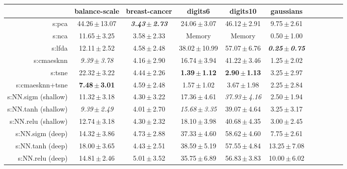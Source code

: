 \begin{table}[ht] \centering
{\small\renewcommand{\arraystretch}{0.7}
\setlength{\tabcolsep}{1pt}
\hspace*{-36pt}
\begin{tabular}{rcccccccccc}
\toprule


& \multicolumn{1}{c}{balance-scale} & \multicolumn{1}{c}{breast-cancer} & \multicolumn{1}{c}{digits6} & \multicolumn{1}{c}{digits10} & \multicolumn{1}{c}{gaussians} \\ 
\midrule
s:\ac{pca} & 44.26\,$\pm$\,13.07 & \emph{\textbf{3.43\,$\pm$\,2.73}} & 24.06\,$\pm$\,3.07 & 46.12\,$\pm$\,2.91 & 9.75\,$\pm$\,2.61 \\
s:\ac{nca} & 11.65\,$\pm$\,3.25 & 3.58\,$\pm$\,2.33 & Memory  & Memory  & 0.50\,$\pm$\,1.00 \\
s:\ac{lfda} & 12.11\,$\pm$\,2.52 & 4.58\,$\pm$\,2.48 & 38.02\,$\pm$\,10.99 & 57.07\,$\pm$\,6.76 & \emph{\textbf{0.25\,$\pm$\,0.75}} \\
s:\ac{cmaesknn} & \emph{9.39\,$\pm$\,3.78} & 4.16\,$\pm$\,2.90 & 16.74\,$\pm$\,3.94 & 41.22\,$\pm$\,3.46 & 1.25\,$\pm$\,2.02 \\
s:\ac{tsne} & 22.32\,$\pm$\,3.22 & 4.44\,$\pm$\,2.26 & \textbf{1.39\,$\pm$\,1.12} & \textbf{2.90\,$\pm$\,1.13} & 3.25\,$\pm$\,2.97 \\
s:\ac{cmaesknn}+\ac{tsne} & \textbf{7.48\,$\pm$\,3.01} & 4.59\,$\pm$\,2.48 & 1.57\,$\pm$\,1.02 & 3.67\,$\pm$\,1.98 & 2.25\,$\pm$\,2.84 \\
s:NN.sigm (shallow) & 11.32\,$\pm$\,3.18 & 4.30\,$\pm$\,3.22 & 17.36\,$\pm$\,4.61 & \emph{37.93\,$\pm$\,4.16} & 2.50\,$\pm$\,1.94 \\
s:NN.\ac{tanh} (shallow) & \emph{9.39\,$\pm$\,2.49} & 4.01\,$\pm$\,2.70 & \emph{15.68\,$\pm$\,3.35} & 39.07\,$\pm$\,4.64 & 3.25\,$\pm$\,3.17 \\
s:NN.\ac{relu} (shallow) & 12.74\,$\pm$\,3.18 & 4.30\,$\pm$\,2.32 & 18.10\,$\pm$\,3.98 & 40.68\,$\pm$\,4.35 & 3.00\,$\pm$\,2.45 \\
s:NN.sigm (deep) & 14.32\,$\pm$\,3.86 & 4.73\,$\pm$\,2.88 & 37.33\,$\pm$\,4.60 & 58.62\,$\pm$\,4.60 & 7.75\,$\pm$\,2.61 \\
s:NN.\ac{tanh} (deep) & 18.00\,$\pm$\,3.65 & 4.43\,$\pm$\,2.51 & 38.59\,$\pm$\,5.19 & 57.55\,$\pm$\,4.84 & 13.25\,$\pm$\,7.08 \\
s:NN.\ac{relu} (deep) & 14.81\,$\pm$\,2.46 & 5.01\,$\pm$\,3.52 & 35.75\,$\pm$\,6.89 & 56.83\,$\pm$\,3.83 & 10.00\,$\pm$\,6.02 \\

\end{tabular}}
\end{table}
